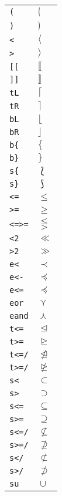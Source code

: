 \begin{longtable}{ll}
\texttt{(}&${}\lgroup {}$\\
\texttt{)}&${}\rgroup {}$\\
\texttt{<}&${}\langle {}$\\
\texttt{>}&${}\rangle {}$\\
\texttt{[[}&${}\llbracket {}$\\
\texttt{]]}&${}\rrbracket {}$\\
\texttt{tL}&${}\lceil {}$\\
\texttt{tR}&${}\rceil {}$\\
\texttt{bL}&${}\lfloor {}$\\
\texttt{bR}&${}\rfloor {}$\\
\texttt{b\{}&${}\{ {}$\\
\texttt{b\}}&${}\} {}$\\
\texttt{s\{}&${}\lbag {}$\\
\texttt{s\}}&${}\rbag {}$\\
\texttt{<=}&${}\leq {}$\\
\texttt{>=}&${}\geq {}$\\
\texttt{<=>=}&${}\lesseqgtr {}$\\
\texttt{<2}&${}\ll {}$\\
\texttt{>2}&${}\gg {}$\\
\texttt{e<}&${}\prec {}$\\
\texttt{e<{-}}&${}\preceq {}$\\
\texttt{e<=}&${}\preccurlyeq {}$\\
\texttt{eor}&${}\curlyvee {}$\\
\texttt{eand}&${}\curlywedge {}$\\
\texttt{t<=}&${}\trianglelefteq {}$\\
\texttt{t>=}&${}\trianglerighteq {}$\\
\texttt{t<=/}&${}\ntrianglelefteq {}$\\
\texttt{t>=/}&${}\ntrianglerighteq {}$\\
\texttt{s<}&${}\subset {}$\\
\texttt{s>}&${}\supset {}$\\
\texttt{s<=}&${}\subseteq {}$\\
\texttt{s>=}&${}\supseteq {}$\\
\texttt{s<=/}&${}\not\subseteq {}$\\
\texttt{s>=/}&${}\not\supseteq {}$\\
\texttt{s</}&${}\not\subset {}$\\
\texttt{s>/}&${}\not\supset {}$\\
\texttt{su}&${}\cup {}$\\

\end{longtable}
